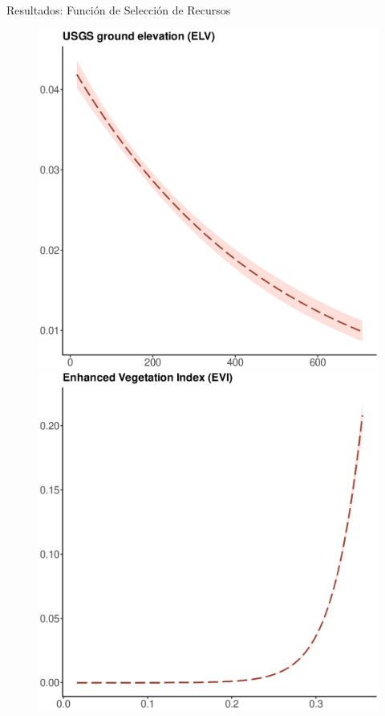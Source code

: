 \documentclass[11pt]{beamer}
\begin{document}
\begin{frame}{Resultados: Función de Selección de Recursos}

        \begin{figure}
            \includegraphics[scale=0.23]{images/m_effects_elevation}
            \includegraphics[scale=0.23]{images/m_effects_evi}\\

\end{figure}
\end{frame}
\end{document}
